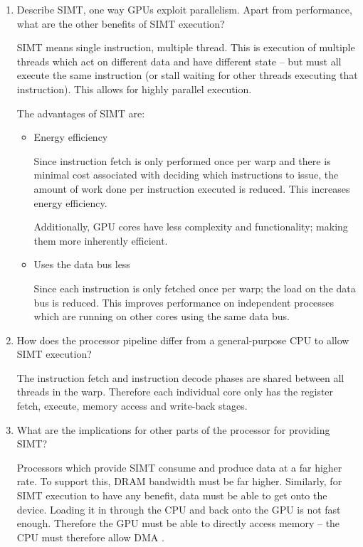 \documentclass[10pt,\jkfside,a4paper]{article}
\begin{document}
\begin{enumerate}

\item Describe SIMT, one way GPUs exploit parallelism. Apart from
performance, what are the other benefits of SIMT execution?

SIMT means single instruction, multiple thread. This is execution of multiple
threads which act on different data and have different state -- but must all
execute the same instruction (or stall waiting for other threads executing
that instruction). This allows for highly parallel execution.

The advantages of SIMT are:

\begin{itemize}

\item Energy efficiency

Since instruction fetch is only performed once per warp and there is minimal
cost associated with deciding which instructions to issue, the amount of
work done per instruction executed is reduced. This increases energy efficiency.

Additionally, GPU cores have less complexity and functionality; making them
more inherently efficient.

\item Uses the data bus less

Since each instruction is only fetched once per warp; the load on the
data bus is reduced. This improves performance on independent processes
which are running on other cores using the same data bus.

\end{itemize}

\item How does the processor pipeline differ from a general-purpose CPU to
allow SIMT execution?

The instruction fetch and instruction decode phases are shared between all
threads in the warp. Therefore each individual core only has the register
fetch, execute, memory access and write-back stages.

\item What are the implications for other parts of the processor for
providing SIMT?

Processors which provide SIMT consume and produce data at a far higher rate.
To support this, DRAM bandwidth must be far higher. Similarly, for SIMT
execution to have any benefit, data must be able to get onto the device.
Loading it in through the CPU and back onto the GPU is not fast enough.
Therefore the GPU must be able to directly access memory -- the CPU must
therefore allow DMA .


\end{enumerate}
\end{document}

